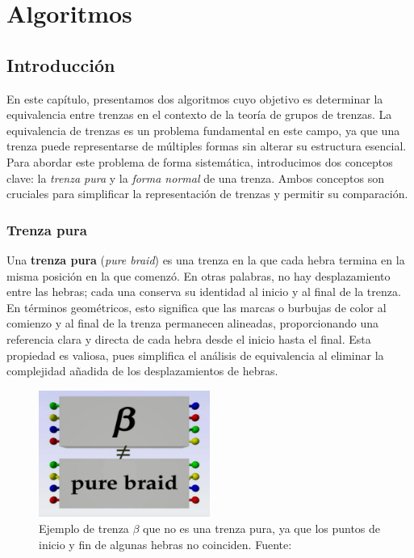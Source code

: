\chapter{Algoritmos}
\label{ch::capitulo3}

\section{Introducción}

En este capítulo, presentamos dos algoritmos cuyo objetivo es determinar la equivalencia entre trenzas en el contexto de la teoría de grupos de trenzas. La equivalencia de trenzas es un problema fundamental en este campo, ya que una trenza puede representarse de múltiples formas sin alterar su estructura esencial. Para abordar este problema de forma sistemática, introducimos dos conceptos clave: la \textit{trenza pura} y la \textit{forma normal} de una trenza. Ambos conceptos son cruciales para simplificar la representación de trenzas y permitir su comparación.

\subsection{Trenza pura}

Una \textbf{trenza pura} (\textit{pure braid}) es una trenza en la que cada hebra termina en la misma posición en la que comenzó. En otras palabras, no hay desplazamiento entre las hebras; cada una conserva su identidad al inicio y al final de la trenza. En términos geométricos, esto significa que las marcas o burbujas de color al comienzo y al final de la trenza permanecen alineadas, proporcionando una referencia clara y directa de cada hebra desde el inicio hasta el final. Esta propiedad es valiosa, pues simplifica el análisis de equivalencia al eliminar la complejidad añadida de los desplazamientos de hebras.

\begin{figure}[h!]
    \centering
    \includegraphics[width=0.5\textwidth]{figures/chapters/3_algoritmos/pure_braid.png}
    \caption{Ejemplo de trenza $\beta$ que no es una trenza pura, ya que los puntos de inicio y fin de algunas hebras no coinciden. Fuente: \cite{esterdalvitBraidsChapter22013}}
\end{figure}

